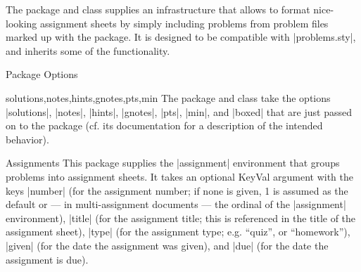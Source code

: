 
The  package and class supplies an infrastructure that allows to format
nice-looking assignment sheets by simply including problems from problem files marked up
with the  package.  It is designed to be compatible with |problems.sty|, and
inherits some of the functionality.

\begin{sfragment}[id=sec:user:options]{Package Options}

\begin{variable}{solutions,notes,hints,gnotes,pts,min}
  The  package and class take the options |solutions|, |notes|, |hints|,
  |gnotes|, |pts|, |min|, and |boxed| that are just passed on to the 
  package (cf. its documentation for a description of the intended behavior).
\end{variable}
\end{sfragment}

\begin{sfragment}{Assignments}
This package supplies the |assignment| environment that groups
problems into assignment sheets. It takes an optional KeyVal argument with the keys
|number| (for the assignment number; if none is given, 1 is
assumed as the default or --- in multi-assignment documents --- the ordinal of the
|assignment| environment), |title| (for the assignment title; this
is referenced in the title of the assignment sheet), |type| (for the
assignment type; e.g. ``quiz'', or ``homework''), |given| (for the
date the assignment was given), and |due| (for the date the
assignment is due).
\end{sfragment}

